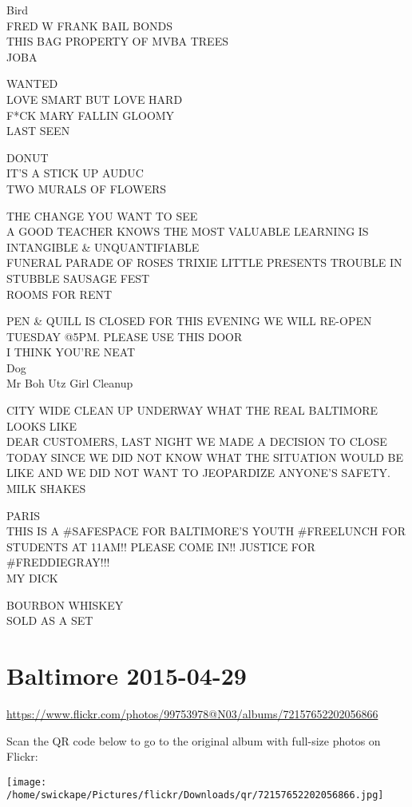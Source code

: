 \documentclass[10pt,letterpaper]{article}
\begin{document}
Bird\\
FRED W FRANK BAIL BONDS\\
THIS BAG PROPERTY OF MVBA TREES\\
JOBA

WANTED\\
LOVE SMART BUT LOVE HARD\\
F*CK MARY FALLIN GLOOMY\\
LAST SEEN

DONUT\\
IT'S A STICK UP AUDUC\\
TWO MURALS OF FLOWERS

THE CHANGE YOU WANT TO SEE\\
A GOOD TEACHER KNOWS THE MOST VALUABLE LEARNING IS INTANGIBLE \& UNQUANTIFIABLE\\
FUNERAL PARADE OF ROSES TRIXIE LITTLE PRESENTS TROUBLE IN STUBBLE SAUSAGE FEST\\
ROOMS FOR RENT

PEN \& QUILL IS CLOSED FOR THIS EVENING WE WILL RE{-}OPEN TUESDAY @5PM.  PLEASE USE THIS DOOR\\
I THINK YOU'RE NEAT\\
Dog\\
Mr Boh Utz Girl Cleanup

CITY WIDE CLEAN UP UNDERWAY WHAT THE REAL BALTIMORE LOOKS LIKE\\
DEAR CUSTOMERS, LAST NIGHT WE MADE A DECISION TO CLOSE TODAY SINCE WE DID NOT KNOW WHAT THE SITUATION WOULD BE LIKE AND WE DID NOT WANT TO JEOPARDIZE ANYONE'S SAFETY.\\
MILK SHAKES

PARIS\\
THIS IS A \#SAFESPACE FOR BALTIMORE'S YOUTH \#FREELUNCH FOR STUDENTS AT 11AM!!  PLEASE COME IN!!  JUSTICE FOR \#FREDDIEGRAY!!!\\
MY DICK

BOURBON WHISKEY\\
SOLD AS A SET
\pagebreak

\section*{Baltimore 2015-04-29}

\url{https://www.flickr.com/photos/99753978@N03/albums/72157652202056866}

Scan the QR code below to go to the original album with full-size photos on Flickr:

\texttt{[image: /home/swickape/Pictures/flickr/Downloads/qr/72157652202056866.jpg]}
\pagebreak
\end{document}
